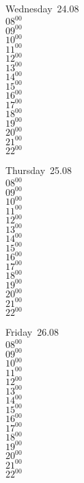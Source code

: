 \documentclass[11pt,a4paper]{book}\usepackage[]{graphicx}\usepackage[]{color}
\begin{document}
\begin{weekdaybox}
  Wednesday~24.08\\
  { 
  \vfill
  $08^{00}$\\
$09^{00}$\\
$10^{00}$\\
$11^{00}$\\
$12^{00}$\\
$13^{00}$\\
$14^{00}$\\
$15^{00}$\\
$16^{00}$\\
$17^{00}$\\
$18^{00}$\\
$19^{00}$\\
$20^{00}$\\
$21^{00}$\\
$22^{00}$\\
  }
\end{weekdaybox}
\clearpage
\begin{headerbox}
\end{headerbox}
\begin{weekdaybox}
  Thursday~25.08\\
  { 
  \vfill
  $08^{00}$\\
$09^{00}$\\
$10^{00}$\\
$11^{00}$\\
$12^{00}$\\
$13^{00}$\\
$14^{00}$\\
$15^{00}$\\
$16^{00}$\\
$17^{00}$\\
$18^{00}$\\
$19^{00}$\\
$20^{00}$\\
$21^{00}$\\
$22^{00}$\\
  }
\end{weekdaybox} 
\begin{weekdaybox}
  Friday~26.08\\
  { 
  \vfill
  $08^{00}$\\
$09^{00}$\\
$10^{00}$\\
$11^{00}$\\
$12^{00}$\\
$13^{00}$\\
$14^{00}$\\
$15^{00}$\\
$16^{00}$\\
$17^{00}$\\
$18^{00}$\\
$19^{00}$\\
$20^{00}$\\
$21^{00}$\\
$22^{00}$\\
  }
\end{weekdaybox}
\end{document}
